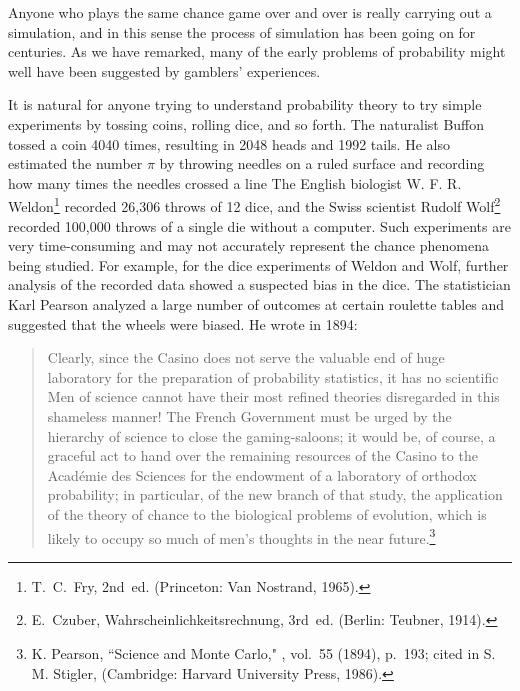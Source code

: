Anyone who plays the same chance game over and over is really carrying out a
simulation, and in this sense the process of simulation has been going on for
centuries.  As we have remarked, many of the early problems of probability
might well have been suggested by gamblers' experiences.  
\par
It is natural for anyone trying to understand probability theory to try
simple experiments by tossing coins, rolling dice, and so forth.  The naturalist
Buffon tossed a coin 4040 times, resulting in 2048 heads and 1992 tails.  He
also estimated the number $\pi$ by throwing needles on a ruled surface and
recording how many times the needles crossed a line   The English biologist W. F. R. Weldon\footnote{T.~C.~Fry,
 2nd~ed. (Princeton: Van Nostrand, 1965).}
recorded 26{,}306 throws of 12 dice, and the
Swiss scientist Rudolf Wolf\footnote{E.~Czuber, \emx
{Wahrscheinlichkeitsrechnung,} 3rd~ed. (Berlin: Teubner, 1914).} recorded
100{,}000 throws of a single die without a computer.  Such experiments are
very
time-consuming and may not accurately represent the chance phenomena being
studied.  For example, for the dice experiments of Weldon and Wolf, further
analysis of the recorded data showed a suspected bias in the dice.  The
statistician Karl Pearson analyzed a large number of outcomes at certain
roulette tables and suggested that the wheels were biased.  He wrote in 1894:

\begin{quote} 
Clearly, since the Casino does not serve the valuable end of huge
laboratory for the preparation of probability statistics, it has no
scientific
  Men of science cannot have their most refined
theories disregarded in this shameless manner!  The French Government must be
urged by the hierarchy of science to close the gaming-saloons; it would be,
of
course, a graceful act to hand over the remaining resources of the Casino to
the
Acad\'emie des Sciences for the endowment of a laboratory of orthodox
probability; in particular, of the new branch of that study, the application
of
the theory of chance to the biological problems of evolution, which is likely
to occupy so much of men's thoughts in the near future.\footnote{K. Pearson,
``Science and Monte Carlo," , vol.~55 (1894),
p.~193;
cited in S. M. Stigler,  (Cambridge: Harvard
University Press, 1986).}
\end{quote}

